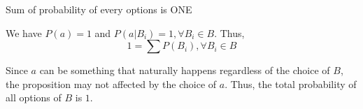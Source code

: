 \begin{proposition}
    \label{Proposition: Sum of probability of every options is ONE}
    Sum of probability of every options is ONE

    We have $P(a) = 1$ and $P(a|B_i)=1, \forall B_i \in B$.
    Thus,
    \begin{equation*}
        1 = \sum P(B_i), \forall B_i \in B
    \end{equation*}

    Since $a$ can be something that naturally happens regardless of the choice of $B$, the proposition may not affected by the choice of $a$.
    Thus, the total probability of all options of $B$ is $1$.
\end{proposition}


